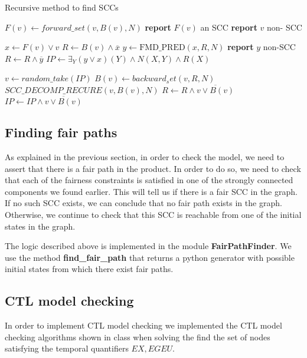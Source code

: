 \documentclass[11pt]{article}
\begin{document}
        \begin{algorithm}[H]
            \caption{Recursive method to find SCCs}\label{recursiveSCC}
                \State $F(v) \gets forward\_set(v, B(v), N)$
                    \State \textbf{report} $F(v)$ an SCC
                \Else
                    \State \textbf{report} $v$ non- SCC
                \EndIf

                \State $x \gets F(v) \vee v$
                \State $R \gets B(v) \wedge \overline{x}$
                \State $y \gets \text{FMD\_PRED}(x, R, N)$
                \State \textbf{report} $y$ non-SCC
                \State $R \gets R \wedge \overline{y}$
                \State $IP \gets \exists_Y (y\vee x)(Y)\wedge N(X,Y) \wedge R(X)$
                
                    \State $v \gets random\_take(IP)$
                    \State $B(v) \gets backward_set(v, R, N)$
                    \State $SCC\_DECOMP\_RECURE(v, B(v), N)$
                    \State $R \gets R \wedge \overline{v \vee B(v)}$
                    \State $IP \gets IP \wedge \overline {v \vee B(v)}$

            \EndProcedure
        \end{algorithm}

    \subsection{Finding fair paths}
        As explained in the previous section, in order to check the model, we
        need to assert that there is a fair path in the product. In order to do 
        so, we need to check that each of the fairness constraints is satisfied
        in one of the strongly connected components we found earlier.
        This will tell us if there is a fair SCC in the graph. If no such SCC 
        exists, we can conclude that no fair path exists in the graph. Otherwise,
        we continue to check that this SCC is reachable from one of the initial
        states in the graph.
        
        The logic described above is implemented in the module 
        \textbf{FairPathFinder}. We use the method \textbf{find\_fair\_path}
        that returns a python generator with possible initial states from
        which there exist fair paths.

    \subsection{CTL model checking}
        In order to implement CTL model checking we implemented the CTL model
        checking algorithms shown in class when solving the find the set
        of nodes satisfying the temporal quantifiers $EX, EG EU$.
\end{document}
